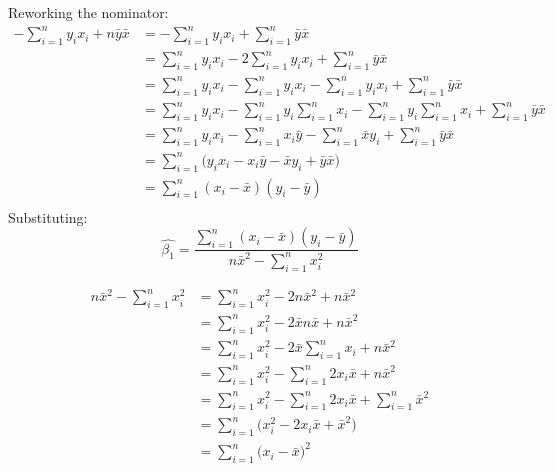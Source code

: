 \documentclass{article}
\begin{document}
Reworking the nominator:
\begin{align*}
-\sum_{i=1}^{n}  y_i x_i + n\bar{y}\bar{x} & = -\sum_{i=1}^{n}y_i x_i + \sum_{i=1}^{n}\bar{y}\bar{x} \\
& = \sum_{i=1}^{n}y_i x_i - 2\sum_{i=1}^{n}y_i x_i + \sum_{i=1}^{n}\bar{y}\bar{x} \\
& = \sum_{i=1}^{n}y_i x_i - \sum_{i=1}^{n}y_i x_i - \sum_{i=1}^{n}y_i x_i + \sum_{i=1}^{n}\bar{y}\bar{x} \\
& = \sum_{i=1}^{n}y_i x_i - \sum_{i=1}^{n}y_i \sum_{i=1}^{n}x_i - \sum_{i=1}^{n}y_i \sum_{i=1}^{n}x_i + \sum_{i=1}^{n}\bar{y}\bar{x} \\
& = \sum_{i=1}^{n}y_i x_i - \sum_{i=1}^{n}x_i \bar{y} - \sum_{i=1}^{n}\bar{x}y_i + \sum_{i=1}^{n}\bar{y}\bar{x} \\
& = \sum_{i=1}^{n}\big(y_i x_i - x_i \bar{y} - \bar{x}y_i + \bar{y}\bar{x}\big) \\
& = \sum_{i=1}^{n}(x_i - \bar{x})(y_i - \bar{y}) \\
\end{align*}
Substituting:
$$
\hat{\beta_1}=  \frac{\sum_{i=1}^{n}(x_i - \bar{x})(y_i - \bar{y})}{n\bar{x}^2 - \sum_{i=1}^{n}x_i^2}
$$

\begin{align*}
n\bar{x}^2 - \sum_{i=1}^{n}x_i^2 & = \sum_{i=1}^{n}x_i^2 - 2n\bar{x}^2 + n\bar{x}^2 \\
& = \sum_{i=1}^{n}x_i^2 - 2\bar{x}n\bar{x} + n\bar{x}^2 \\
& = \sum_{i=1}^{n}x_i^2 - 2\bar{x}\sum_{i=1}^{n}x_i + n\bar{x}^2 \\
& = \sum_{i=1}^{n}x_i^2 - \sum_{i=1}^{n}2x_i\bar{x} + n\bar{x}^2 \\
& = \sum_{i=1}^{n}x_i^2 - \sum_{i=1}^{n}2x_i\bar{x} + \sum_{i=1}^{n}\bar{x}^2 \\
& = \sum_{i=1}^{n}\big(x_i^2 - 2x_i\bar{x} + \bar{x}^2\big) \\
& = \sum_{i=1}^{n}\big(x_i - \bar{x}\big)^2 \\
\end{align*}
\end{document}
